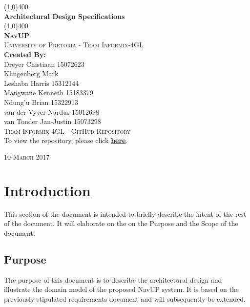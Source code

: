 \documentclass{article}
\begin{document}
	\begin{titlepage}
		\begin{center}

			\line(1,0){400}\\
			[6mm]
			\huge{
				\bfseries Architectural Design Specifications
			}\\
			[2mm]
			\line(1,0){400}\\
			[15mm]
			\textsc{\large{\textbf{NavUP}}}\\
			[4.5mm]
			\textsc{\large University of Pretoria - Team Informix-4GL}\\
			[20mm]
			\large{\textbf{Created By:}}\\
			[2mm]
			\large{
				Dreyer Chistiaan 15072623 \\
				Klingenberg Mark  \\
				Leshaba Harris 15312144 \\
				Mangwane Kenneth 15183379 \\
				Ndung'u Brian 15322913 \\
				van der Vyver Nardus 15012698 \\
				van Tonder Jan-Justin 15073298
			}\\
			[30mm]
			
		\textsc{\Large Team Informix-4GL - GitHub Repository}\\[2mm]
			To view the repository, please click 
		\href{https://github.com/MarkKlingenberg/Informix-4gl}{\textbf{here}}. \\[45mm]
		\end{center}
		\begin{flushright}
			\textsc{\large 10 March 2017}
		\end{flushright}
	\end{titlepage}

	\cleardoublepage
	\thispagestyle{empty}
	\tableofcontents
	\cleardoublepage

	\thispagestyle{empty}
	\listoffigures
	\cleardoublepage
	\setcounter{page}{1}
	
	\section{Introduction}\label{sec: introduction}
		This section of the document is intended to briefly describe the intent of the rest of the document. It will elaborate on the on the Purpose and the Scope of the document.
		
		\subsection{Purpose}\label{sec: purpose}
			The purpose of this document is to describe the architectural design and illustrate the domain model of the proposed NavUP system. It is based on the previously stipulated requirements document and will subsequently be extended.\\
			
\end{document}
